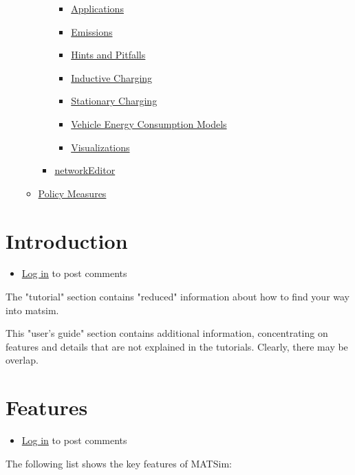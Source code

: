 \documentclass[a4paper,11pt]{report}
\begin{document}
\begin{itemize}
\begin{itemize}
\begin{itemize}
\begin{itemize}
	\item \href{http://www.matsim.org/node/720}{Applications}
	\item \href{http://www.matsim.org/node/719}{Emissions}
	\item \href{http://www.matsim.org/node/718}{Hints and Pitfalls}
	\item \href{http://www.matsim.org/node/715}{Inductive Charging}
	\item \href{http://www.matsim.org/node/717}{Stationary Charging}
	\item \href{http://www.matsim.org/node/716}{Vehicle Energy Consumption Models}
	\item \href{http://www.matsim.org/node/721}{Visualizations}
\end{itemize}
	\item \href{http://www.matsim.org/docs/extensions/networkEditor}{networkEditor}
\end{itemize}
	\item \href{http://www.matsim.org/node/563}{Policy Measures}
\end{itemize}
\end{itemize}


\chapter{Introduction}
\begin{itemize}
	\item \href{http://www.matsim.org/user/login?destination=comment/reply/139%23comment-form}{Log in} to post comments
\end{itemize}

The "tutorial" section contains "reduced" information about how to find your way into matsim.

This "user's guide" section contains additional information,  concentrating on features and details that are not explained in the  tutorials. Clearly, there may be overlap.

\chapter{Features}
\begin{itemize}
	\item \href{http://www.matsim.org/user/login?destination=comment/reply/140%23comment-form}{Log in} to post comments
\end{itemize}

The following list shows the key features of MATSim:
\end{document}
